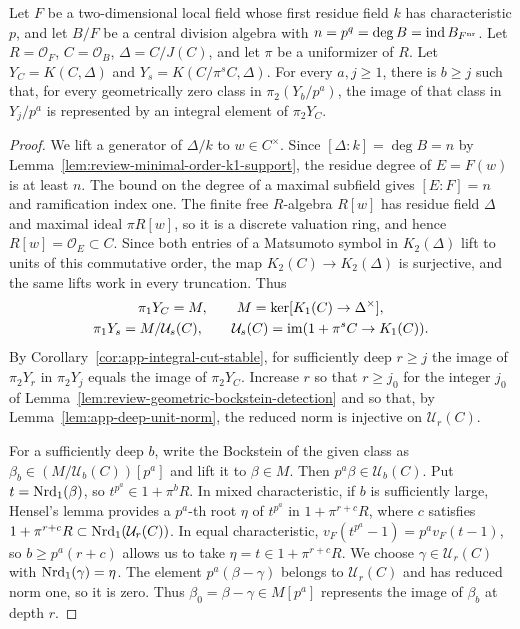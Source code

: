\begin{lemma}
\label{lem:review-geometric-moore-integral-lift}
Let $F$ be a two-dimensional local field whose first residue field $k$ has characteristic $p$, and let $B/F$ be a central division algebra with $n=p^q=\deg B=\operatorname{ind} B_{F^{\mathrm{nr}}}$.
Let $R=\mathcal O_F$, $C=\mathcal O_B$, $\Delta=C/J(C)$, and let $\pi$ be a uniformizer of $R$.
Let $Y_C=K(C,\Delta)$ and $Y_s=K(C/\pi^sC,\Delta)$.
For every $a,j\ge1$, there is $b\ge j$ such that, for every geometrically zero class in $\pi_2(Y_b/p^a)$, the image of that class in $Y_j/p^a$ is represented by an integral element of $\pi_2Y_C$.
\end{lemma}
\begin{proof}
We lift a generator of $\Delta/k$ to $w\in C^\times$.
Since $[\Delta:k]=\deg B=n$ by Lemma~\ref{lem:review-minimal-order-k1-support}, the residue degree of $E=F(w)$ is at least $n$.
The bound on the degree of a maximal subfield gives $[E:F]=n$ and ramification index one.
The finite free $R$-algebra $R[w]$ has residue field $\Delta$ and maximal ideal $\pi R[w]$, so it is a discrete valuation ring, and hence $R[w]=\mathcal O_E\subset C$.
Since both entries of a Matsumoto symbol in $K_2(\Delta)$ lift to units of this commutative order, the map $K_2(C)\to K_2(\Delta)$ is surjective, and the same lifts work in every truncation.
Thus
\[
\begin{gathered}
 \pi_1Y_C=M,\qquad M=\ker[K_1(C)\to\Delta^\times],\\
 \pi_1Y_s=M/\mathcal U_s(C),\qquad \mathcal U_s(C)=\operatorname{im}(1+\pi^sC\to K_1(C)).
\end{gathered}
\]
By Corollary~\ref{cor:app-integral-cut-stable}, for sufficiently deep $r\ge j$ the image of $\pi_2Y_r$ in $\pi_2Y_j$ equals the image of $\pi_2Y_C$.
Increase $r$ so that $r\ge j_0$ for the integer $j_0$ of Lemma~\ref{lem:review-geometric-bockstein-detection} and so that, by Lemma~\ref{lem:app-deep-unit-norm}, the reduced norm is injective on $\mathcal U_r(C)$.

For a sufficiently deep $b$, write the Bockstein of the given class as $\beta_b\in(M/\mathcal U_b(C))[p^a]$ and lift it to $\beta\in M$.
Then $p^a\beta\in \mathcal U_b(C)$.
Put $t=\operatorname{Nrd}_1(\beta)$, so $t^{p^a}\in1+\pi^bR$.
In mixed characteristic, if $b$ is sufficiently large, Hensel's lemma provides a $p^a$-th root $\eta$ of $t^{p^a}$ in $1+\pi^{r+c}R$, where $c$ satisfies $1+\pi^{r+c}R\subset\operatorname{Nrd}_1(\mathcal U_r(C))$.
In equal characteristic, $v_F(t^{p^a}-1)=p^a v_F(t-1)$, so $b\ge p^a(r+c)$ allows us to take $\eta=t\in1+\pi^{r+c}R$.
We choose $\gamma\in \mathcal U_r(C)$ with $\operatorname{Nrd}_1(\gamma)=\eta$.
The element $p^a(\beta-\gamma)$ belongs to $\mathcal U_r(C)$ and has reduced norm one, so it is zero.
Thus $\beta_0=\beta-\gamma\in M[p^a]$ represents the image of $\beta_b$ at depth $r$.


\end{proof}

